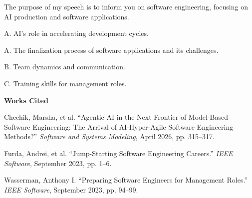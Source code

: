 \documentclass[12pt]{article}
\begin{document}
 
\begin{doublespace}

 \begin{center}
 \end{center}

\bigskip
 
 The purpose of my speech is to inform you on software engineering, focusing on AI production and software applications.
 
\bigskip
 
 
\noindent \hspace{1em} A. AI's role in accelerating development cycles.
 
\bigskip
 
 
\noindent \hspace{1em} A. The finalization process of software applications and its challenges.
 
\noindent \hspace{1em} B. Team dynamics and communication.
 
\noindent \hspace{1em} C. Training skills for management roles.

\bigskip


\newpage

\begin{center}
    \textbf{Works Cited}
\end{center}

\begin{center}
{Chechik, Marsha}, et al. ``Agentic AI in the Next Frontier of Model-Based Software Engineering: The Arrival of AI-Hyper-Agile Software Engineering Methods?'' \textit{Software and Systems Modeling}, April 2026, pp. 315--317.

\medskip

{Furda, Andrei}, et al. ``Jump-Starting Software Engineering Careers.'' \textit{IEEE Software}, September 2023, pp. 1--6.

\medskip

{Wasserman, Anthony I.} ``Preparing Software Engineers for Management Roles.'' \textit{IEEE Software}, September 2023, pp. 94--99.
\end{center}

\end{doublespace}
 
\end{document}
